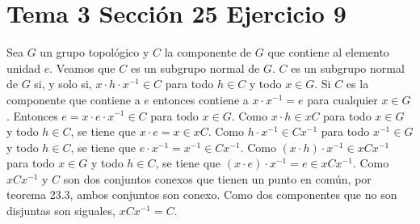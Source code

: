 \documentclass{article}
\begin{document}
\section{Tema 3 Sección 25 Ejercicio 9}
Sea $G$ un grupo topológico y $C$ la componente de $G$ que contiene al elemento unidad $e$. Veamos que $C$ es un subgrupo normal de $G$. $C$ es un subgrupo normal de $G$ si, y solo si, $x\cdot h \cdot x^{-1}\in C$ para todo $h\in C$ y todo $x\in G$. Si $C$ es la componente que contiene a $e$ entonces contiene a $x\cdot x^{-1}=e$ para cualquier $x\in G$. Entonces $e= x\cdot e \cdot x^{-1}\in C$ para todo $x\in G$. Como $x\cdot h \in xC$ para todo $x\in G$ y todo $h\in C$, se tiene que $x\cdot e= x\in xC$.
Como $h\cdot x^{-1}\in Cx^{-1}$ para todo $x^{-1}\in G$ y todo $h\in C$, se tiene que $e\cdot x^{-1}= x^{-1}\in Cx^{-1}$. Como $(x\cdot h )\cdot x^{-1}\in xCx^{-1}$ para todo $x\in G$ y todo $h\in C$, se tiene que $(x\cdot e)\cdot x^{-1}= e\in xCx^{-1}$. Como $xCx^{-1}$ y $C$ son dos conjuntos conexos que tienen un punto en común, por teorema 23.3, ambos conjuntos son conexo. Como dos componentes que no son disjuntas son siguales, $xCx^{-1}=C$.
\end{document}
